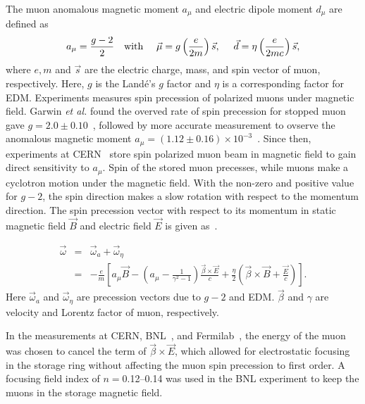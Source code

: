 The muon anomalous magnetic moment $a_{\mu}$ and electric dipole moment $d_{\mu}$ are defined as 
\begin{equation}
a_{\mu} = \frac{g-2}{2} ~~~ {\rm with} ~~~~ \vec{\mu} = g \left( \frac{e}{2m}
                  \right) \vec{s}, ~~~~
\vec{d} = \eta \left( \frac{e}{2mc}
                  \right) \vec{s},
\end{equation}
where $e, m$ and $\vec{s}$ are the electric charge, mass, and spin vector of muon, respectively.
Here, $g$ is the Land\'e's $g$ factor and $\eta$ is a corresponding factor for EDM.
Experiments measures spin precession of polarized muons under magnetic field.
Garwin \textit{et al.} found the overved rate of spin precession for stopped muon gave $g = 2.0 \pm 0.10$~\cite{Garwin:1957hc}, 
followed by more accurate measurement to ovserve the anomalous magnetic moment $a_{\mu}=(1.12 \pm 0.16)\times 10^{-3}$~\cite{Garwin:1960zz}.
Since then, experiments at CERN~\cite{Charpak:1961mz,Bailey:1969pr,Bailey:1975qi,Bailey:1978mn} 
store spin polarized muon beam in magnetic field to gain direct sensitivity to $a_{\mu}$.
Spin of the stored muon precesses, while muons make a cyclotron motion under the magnetic field.
With the non-zero and positive value for $g-2$, the spin direction makes a slow rotation 
with respect to the momentum direction.
The spin precession vector with respect to its momentum 
in static magnetic field $\vec{B}$ and electric field $\vec{E}$
is given as~\cite{Thomas1927,PhysRevLett.2.435,PhysRevLett.2.492,Khriplovich:1998zq,Fukuyama:2013ioa,Fukuyama:2018nbl}.

\begin{eqnarray} 
\vec{\omega} & = & \vec{\omega}_{a} + \vec{\omega}_{\eta} \\ 
             & = & 
  - \frac{e}{m}\left[a_{\mu} \vec{B} - 
   \left( a_{\mu}- \frac{1}{\gamma^2-1} \right)
   \frac{\vec{\beta} \times \vec{E}}{c}
  +\frac{\eta}{2} 
   \left(\vec{\beta} \times \vec{B}  + \frac{\vec{E}}{c}
   \right)
   \right].
\label{eq:omega_full}
\end{eqnarray}
Here $\vec{\omega}_{a}$ and $\vec{\omega}_{\eta}$ are precession vectors
due to $g-2$ and EDM. $\vec{\beta}$ and $\gamma$ are velocity and Lorentz factor of muon,
respectively.

In the measurements at CERN, BNL~\cite{Bennett:2006fi},
and Fermilab~\cite{Grange:2015fou}, the energy of the muon
was chosen to cancel the term of $\vec{\beta} \times \vec{E}$,
which allowed for electrostatic focusing in the storage ring 
without affecting the muon spin precession to first order. 
A focusing field index of $n =$0.12--0.14 was used in the BNL experiment
to keep the muons in the storage magnetic field.

